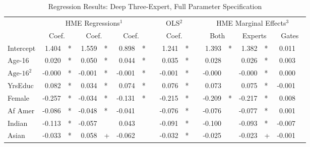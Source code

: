 \documentclass[12pt]{article}
\theoremstyle{definition}
\begin{document}
\begin{landscape}
  \begin{table} \centering
    \caption{Regression Results: Deep Three-Expert, Full Parameter Specification}
      \begin{threeparttable}
        \begin{tabular}[l]{l r l r l r l c r l c r l r l r l}
  
  \cmidrule{1-17}
  & \multicolumn{6}{c}{HME Regressions$^{1}$} &&  \multicolumn{2}{c}{OLS$^{2}$} && \multicolumn{6}{c}{HME Marginal Effects$^{3}$} \\
  \cmidrule(l){2-7}    \cmidrule(l){9-10}     \cmidrule(l){12-17}
  & \multicolumn{2}{c}{Coef.} &  \multicolumn{2}{c}{Coef.} &  \multicolumn{2}{c}{Coef.}  && \multicolumn{2}{c}{Coef.} && \multicolumn{2}{c}{Both}    &  \multicolumn{2}{c}{Experts}  &  \multicolumn{2}{c}{Gates} \\
                  \cmidrule(l){2-3} \cmidrule(l){4-5} \cmidrule(l){6-7} \cmidrule(l){9-10} \cmidrule(l){12-13} \cmidrule(l){14-15} \cmidrule(l){16-17}
  Intercept             &  1.404 & *      &  1.559 & *      &  0.898 & *      &&  1.241 & *     &&  1.393 & *        &  1.382 & *        &  0.011 &        \\
  Age-16                &  0.020 & *      &  0.050 & *      &  0.044 & *      &&  0.035 & *     &&  0.028 &          &  0.026 & *        &  0.003 &        \\
  $\textrm{Age-16}^{2}$ & -0.000 & *      & -0.001 & *      & -0.001 & *      && -0.001 & *     && -0.000 &          & -0.000 & *        &  0.000 &        \\
  YrsEduc               &  0.082 & *      &  0.034 & *      &  0.074 & *      &&  0.076 & *     &&  0.073 &          &  0.075 & *        & -0.001 &        \\
  Female                & -0.257 & *      & -0.034 & *      & -0.131 & *      && -0.215 & *     && -0.209 & *        & -0.217 & *        &  0.008 &        \\
  Af Amer               & -0.086 & *      & -0.048 & *      & -0.041 &        && -0.076 & *     && -0.076 &          & -0.077 & *        &  0.001 &        \\
  Indian                & -0.113 & *      & -0.057 &        &  0.043 &        && -0.091 & *     && -0.100 &          & -0.093 & *        & -0.007 &        \\
  Asian                 & -0.033 & *      &  0.058 & +      & -0.062 &        && -0.032 & *     && -0.025 &          & -0.023 & +        & -0.001 &        \\

\end{tabular}
\end{threeparttable}
\end{table}
\end{landscape}
\end{document}
